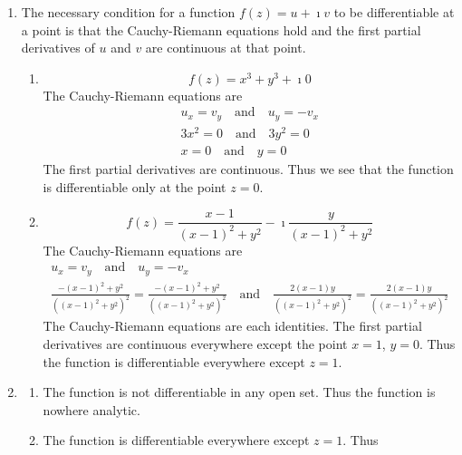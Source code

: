 {%
\begin{Solution}
  \label{solution diff x3f3}
  \begin{enumerate}
  \item
    The necessary condition for a function $f(z) = u + \imath v$ to be
    differentiable at a point is that the Cauchy-Riemann equations
    hold and the first partial derivatives of $u$ and $v$ are
    continuous at that point.
    \begin{enumerate}
    \item
      \[
      f(z) = x^3 + y^3 + \imath 0
      \]
      The Cauchy-Riemann equations are
      \begin{gather*}
        u_x = v_y \quad \mathrm{and} \quad u_y = - v_x 
        \\
        3 x^2 = 0 \quad \mathrm{and} \quad 3 y^2 = 0 
        \\
        x = 0 \quad \mathrm{and} \quad y = 0 
      \end{gather*}
      The first partial derivatives are continuous.  Thus we see that the 
      function is differentiable only at the point $z = 0$.
    \item
      \[
      f(z) = \frac{x - 1}{(x - 1)^2 + y^2} - \imath  \frac{y}{(x - 1)^2 + y^2}
      \]
      The Cauchy-Riemann equations are
      \begin{gather*}
        u_x = v_y \quad \mathrm{and} \quad u_y = - v_x 
        \\
        \frac{-(x - 1)^2 + y^2}{((x - 1)^2 + y^2)^2} 
        = \frac{-(x - 1)^2 + y^2}{((x - 1)^2 + y^2)^2} 
        \quad \mathrm{and} \quad 
        \frac{2 (x - 1) y}{((x - 1)^2 + y^2)^2} 
        = \frac{2 (x - 1) y}{((x - 1)^2 + y^2)^2} 
      \end{gather*}
      The Cauchy-Riemann equations are each identities.  The first
      partial derivatives are continuous everywhere except the point
      $x = 1$, $y = 0$.  Thus the function is differentiable
      everywhere except $z = 1$.
    \end{enumerate}
  \item
    \begin{enumerate}
    \item
      The function is not differentiable in any open set.  Thus the 
      function is nowhere analytic.
    \item
      The function is differentiable everywhere except $z = 1$.  Thus 

\end{enumerate}
\end{enumerate}
\end{Solution}}
